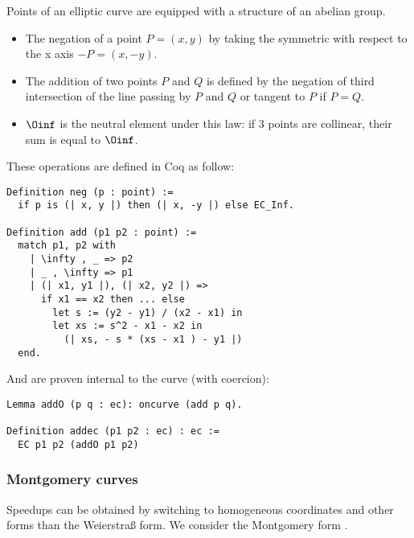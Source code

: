 Points of an elliptic curve are equipped with a structure of an abelian group.
\begin{itemize}
  \item The negation of a point $P = (x,y)$ by taking the symmetric with respect to the x axis $-P = (x, -y)$.
  \item The addition of two points $P$ and $Q$ is defined by the negation of third intersection
  of the line passing by $P$ and $Q$ or tangent to $P$ if $P = Q$.
  \item $\Oinf$ is the neutral element under this law: if 3 points are collinear, their sum is equal to $\Oinf$.
\end{itemize}
These operations are defined in Coq as follow:
\begin{lstlisting}[language=Coq]
Definition neg (p : point) :=
  if p is (| x, y |) then (| x, -y |) else EC_Inf.

Definition add (p1 p2 : point) :=
  match p1, p2 with
    | \infty , _ => p2
    | _ , \infty => p1
    | (| x1, y1 |), (| x2, y2 |) =>
      if x1 == x2 then ... else
        let s := (y2 - y1) / (x2 - x1) in
        let xs := s^2 - x1 - x2 in
          (| xs, - s * (xs - x1 ) - y1 |)
  end.
\end{lstlisting}
And are proven internal to the curve (with coercion):
\begin{lstlisting}[language=Coq]
Lemma addO (p q : ec): oncurve (add p q).

Definition addec (p1 p2 : ec) : ec :=
  EC p1 p2 (addO p1 p2)
\end{lstlisting}

\subsubsection{Montgomery curves}
\label{subsec:ECC-Montgomery}

Speedups can be obtained by switching to homogeneous coordinates and other forms
than the Weierstra{\ss} form. We consider the Montgomery form \cite{MontgomerySpeeding}.

